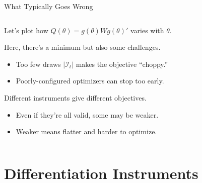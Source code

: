 \documentclass[aspectratio=169,t,11pt,table]{beamer}
\begin{document}
\begin{frame}{What Typically Goes Wrong}
    \begin{columns}
        \begin{column}{0.65\textwidth}
            \begin{wideitemize}
                \item<2-> Let's plot how $Q(\theta) = g(\theta)Wg(\theta)'$ varies with $\theta$.
                \item<3-> Here, there's a minimum but also some challenges.
                \begin{itemize}
                    \item<4-> \alert{Too few draws} $|\mathcal{I}_t|$ makes the objective ``choppy.''
                    \item<5-> \alert{Poorly-configured optimizers} can stop too early.
                \end{itemize}
                \item<6-> Different instruments give different objectives.
                \begin{itemize}
                    \item<7-> Even if they're all valid, some may be weaker.
                    \item<7-> Weaker means flatter and harder to optimize.
                \end{itemize}
            \end{wideitemize}
        \end{column}
        \begin{column}{0.35\textwidth}
            \vspace{0.5\baselineskip}
        \end{column}
    \end{columns}
\end{frame}

\section{Differentiation Instruments}
\end{document}
